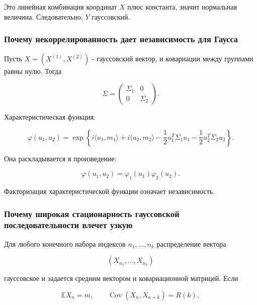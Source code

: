 \documentclass[
  11pt,
  a4paper,
]{article}
\begin{document}
Это линейная комбинация координат \(X\) плюс константа, значит
нормальная величина. Следовательно, \(Y\) гауссовский.

\subsubsection{Почему некоррелированность дает независимость для
Гаусса}\label{ux43fux43eux447ux435ux43cux443-ux43dux435ux43aux43eux440ux440ux435ux43bux438ux440ux43eux432ux430ux43dux43dux43eux441ux442ux44c-ux434ux430ux435ux442-ux43dux435ux437ux430ux432ux438ux441ux438ux43cux43eux441ux442ux44c-ux434ux43bux44f-ux433ux430ux443ux441ux441ux430}

Пусть \(X=(X^{(1)},X^{(2)})\) - гауссовский вектор, и ковариации между
группами равны нулю. Тогда

\[
\Sigma=
\begin{pmatrix}
\Sigma_1 & 0\\
0 & \Sigma_2
\end{pmatrix}.
\]

Характеристическая функция:

\[
\varphi(u_1,u_2)
=
\exp\left\{
i\langle u_1,m_1\rangle+i\langle u_2,m_2\rangle
-\frac12u_1^T\Sigma_1u_1
-\frac12u_2^T\Sigma_2u_2
\right\}.
\]

Она раскладывается в произведение:

\[
\varphi(u_1,u_2)
=
\varphi_1(u_1)\varphi_2(u_2).
\]

Факторизация характеристической функции означает независимость.

\subsubsection{Почему широкая стационарность гауссовской
последовательности влечет
узкую}\label{ux43fux43eux447ux435ux43cux443-ux448ux438ux440ux43eux43aux430ux44f-ux441ux442ux430ux446ux438ux43eux43dux430ux440ux43dux43eux441ux442ux44c-ux433ux430ux443ux441ux441ux43eux432ux441ux43aux43eux439-ux43fux43eux441ux43bux435ux434ux43eux432ux430ux442ux435ux43bux44cux43dux43eux441ux442ux438-ux432ux43bux435ux447ux435ux442-ux443ux437ux43aux443ux44e}

Для любого конечного набора индексов \(n_1,\ldots,n_k\) распределение
вектора

\[
(X_{n_1},\ldots,X_{n_k})
\]

гауссовское и задается средним вектором и ковариационной матрицей. Если

\[
\mathbb EX_n=m,
\qquad
\operatorname{Cov}(X_n,X_{n+k})=R(k),
\]
\end{document}
